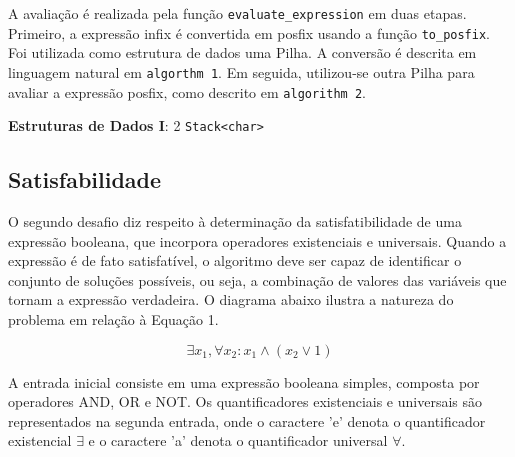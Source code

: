 \documentclass{article}
\begin{document}
\justify


A avaliação é realizada pela função \texttt{evaluate\_expression} em duas etapas. Primeiro, a expressão infix é convertida em posfix usando a função \texttt{to\_posfix}. Foi utilizada como estrutura de dados uma Pilha. A conversão é descrita em linguagem natural em \texttt{algorthm 1}. Em seguida, utilizou-se outra Pilha para avaliar a expressão posfix, como descrito em \texttt{algorithm 2}.

\textbf{Estruturas de Dados I}: 2 \texttt{Stack\textless char\textgreater}


\subsection{Satisfabilidade}
O segundo desafio diz respeito à determinação da satisfatibilidade de uma expressão booleana, que incorpora operadores existenciais e universais. Quando a expressão é de fato satisfatível, o algoritmo deve ser capaz de identificar o conjunto de soluções possíveis, ou seja, a combinação de valores das variáveis que tornam a expressão verdadeira. O diagrama abaixo ilustra a natureza do problema em relação à Equação 1.

\begin{center}
\def\blockdist{2.3}
\def\edgedist{1}
\end{center}


\begin{equation}
\exists x_1, \forall x_2:  x_1 \land \left( x_2 \lor 1 \right)
\end{equation}

\justify



A entrada inicial consiste em uma expressão booleana simples, composta por operadores AND, OR e NOT. Os quantificadores existenciais e universais são representados na segunda entrada, onde o caractere 'e' denota o quantificador existencial $\exists$ e o caractere 'a' denota o quantificador universal $\forall$.
\end{document}
